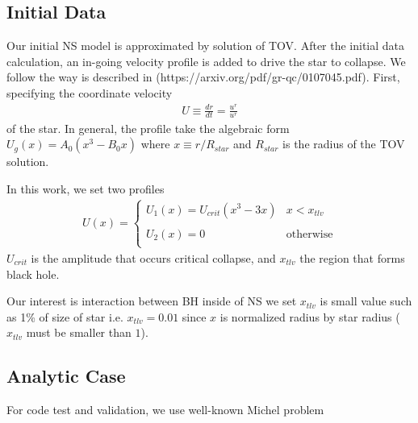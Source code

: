 \documentclass[prd]{revtex4}
\begin{document}

\subsection{Initial Data}
Our initial NS model is approximated by solution of TOV. After the initial data calculation, an in-going velocity profile is added to drive the star to collapse. We follow the way is described in (https://arxiv.org/pdf/gr-qc/0107045.pdf). First, specifying the coordinate velocity
\begin{align}
U \equiv \frac{dr}{dt} = \frac{u^r}{u^r}
\end{align}
of the star. In general, the profile take the algebraic form $U_g(x) = A_0 (x^3 - B_0 x)$ where $x \equiv  r/R_{star}$ and $R_{star}$ is the radius of the TOV solution.

In this work, we set two profiles
\begin{align}
U(x) =
\begin{cases}
U_1(x) = U_{crit} ( x^3 - 3x) & x < x_{tlv} \\
\\
U_2(x) = 0 & \textrm{otherwise} \\
\end{cases}
\end{align}
$U_{crit}$ is the amplitude that occurs critical collapse, and $x_{tlv}$ the region that forms black hole. 

Our interest is interaction between BH inside of NS we set $x_{tlv}$ is small value such as 1\% of size of star i.e. $x_{tlv} = 0.01$ since $x$ is normalized radius by star radius ($x_{tlv}$ must be smaller than $1$).

\subsection{Analytic Case}

For code test and validation, we use well-known Michel problem
\end{document}
